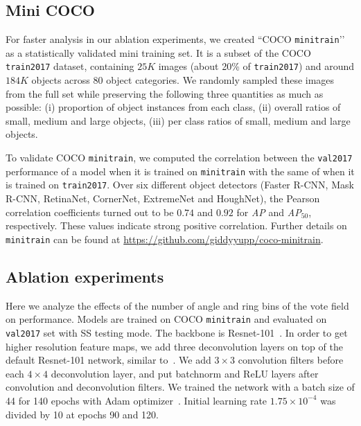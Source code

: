 \documentclass[runningheads]{llncs}
\begin{document}
\subsection{Mini COCO}


For faster analysis in our ablation experiments, we created ``COCO \texttt{minitrain}’’ as a statistically validated mini training set. It is a subset of the COCO \texttt{train2017} dataset,  containing $25K$ images (about 20\% of \texttt{train2017}) and around $184K$ objects across $80$ object categories. We randomly sampled these images from the full set while preserving the following three quantities as much as possible: (i) proportion of object instances from each class, (ii) overall ratios of small, medium and large objects, (iii) per class ratios of small, medium and large objects. 






To validate COCO \texttt{minitrain}, we computed the correlation between the \texttt{val2017} performance of a model when it is trained on \texttt{minitrain} with the same of when it is trained on \texttt{train2017}. Over  six different object detectors (Faster R-CNN, Mask R-CNN, RetinaNet, CornerNet, ExtremeNet and HoughNet), the Pearson correlation coefficients turned out to be $0.74$  and $0.92$ for \textit{AP}  and \textit{AP$_{50}$},  respectively. These values indicate strong positive correlation. Further details on  \texttt{minitrain} can be found at \url{https://github.com/giddyyupp/coco-minitrain}.  




\subsection{Ablation experiments}
\label{sec:vot_abl}
Here we analyze the effects  of the number of angle and ring bins of the vote field on performance. Models are trained on COCO \texttt{minitrain} and evaluated on \texttt{val2017} set with SS testing mode. The backbone is Resnet-101~\cite{resnet}. In order to get higher resolution feature maps, we add three deconvolution layers on top of the default Resnet-101 network, similar to~\cite{xiao2018simple}. We add $3\times3$ convolution filters before each  $4\times4$ deconvolution layer, and put batchnorm and ReLU layers after convolution and deconvolution filters.  We trained the network with a batch size of 44 for 140 epochs with Adam optimizer~\cite{adam}. Initial learning rate $1.75 \times 10^{-4}$ was divided by 10 at epochs 90 and 120.  
\end{document}
